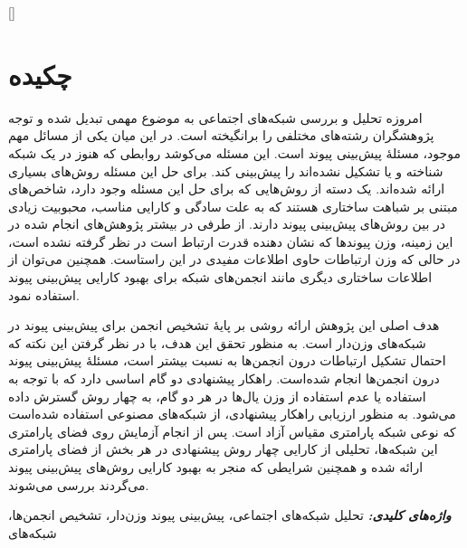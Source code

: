 \newpage
{}[]

\section*{چکیده}
\setlength{\parindent}{2em}
\setlength{\parskip}{1em}
امروزه تحلیل و بررسی شبکه‌های اجتماعی به موضوع مهمی تبدیل شده‌ و توجه  پژوهشگران رشته‌های مختلفی را برانگیخته است. در این میان یکی از مسائل مهم موجود، مسئلهٔ پیش‌بینی پیوند است. این مسئله می‌کوشد روابطی که هنوز در یک شبکه شناخته و یا تشکیل نشده‌اند را پیش‌بینی کند. برای حل این مسئله روش‌های بسیاری ارائه شده‌اند. یک دسته از روش‌هایی که برای حل این مسئله وجود دارد، شاخص‌های مبتنی بر شباهت ساختاری هستند که به علت سادگی و کارایی مناسب، محبوبیت زیادی در بین روش‌های پیش‌بینی پیوند دارند. از طرفی در بیشتر پژوهش‌های انجام شده در این زمینه، وزن پیوندها که نشان دهنده قدرت ارتباط است در نظر گرفته نشده است، در حالی که وزن ارتباطات حاوی اطلاعات مفیدی در این راستاست. همچنین می‌توان از اطلاعات ساختاری دیگری مانند انجمن‌های شبکه برای بهبود کارایی پیش‌بینی پیوند استفاده نمود.

هدف اصلی این پژوهش ارائه روشی بر پایهٔ تشخیص انجمن برای پیش‌بینی پیوند در شبکه‌های وزن‌دار است. به منظور تحقق این هدف، با در نظر گرفتن این نکته که احتمال تشکیل ارتباطات درون انجمن‌ها به نسبت بیشتر است، مسئلهٔ پیش‌بینی پیوند درون انجمن‌ها انجام شده‌است. راهکار پیشنهادی دو گام اساسی دارد که با توجه به استفاده یا عدم استفاده از وزن یال‌ها در هر دو گام، به چهار روش گسترش داده می‌شود. به منظور ارزیابی راهکار پیشنهادی، از شبکه‌های مصنوعی  استفاده شده‌است که نوعی شبکه پارامتری مقیاس آزاد است. پس از انجام آزمایش روی فضای پارامتری این شبکه‌ها، تحلیلی از کارایی چهار روش پیشنهادی در هر بخش از فضای پارامتری ارائه شده و همچنین شرایطی که منجر به بهبود کارایی روش‌های پیش‌بینی پیوند می‌گردند بررسی می‌شوند.

{\Titr \textbf{\textit{واژه‌های کلیدی: }}}
{\small تحلیل شبکه‌های اجتماعی، پیش‌بینی پیوند وزن‌دار، تشخیص انجمن‌ها، شبکه‌های }

\newpage\null\thispagestyle{empty}\newpage
